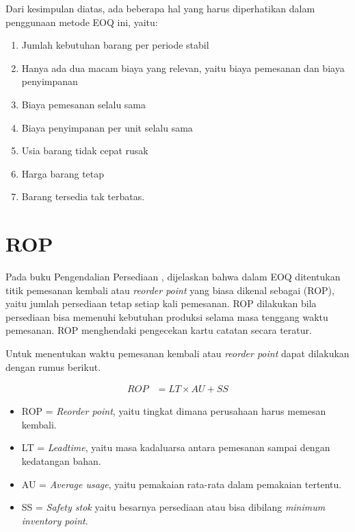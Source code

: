 Dari kesimpulan diatas, ada beberapa hal yang harus diperhatikan dalam penggunaan metode EOQ ini, yaitu:

\begin{enumerate}
	\item Jumlah kebutuhan barang per periode stabil
	\item Hanya ada dua macam biaya yang relevan, yaitu biaya pemesanan dan biaya penyimpanan
	\item Biaya pemesanan selalu sama
	\item Biaya penyimpanan per unit selalu sama
	\item Usia barang tidak cepat rusak
	\item Harga barang tetap
	\item Barang tersedia tak terbatas.
\end{enumerate}

\section{ROP}

Pada buku Pengendalian Persediaan \citep{pengendalianpersediaan}, dijelaskan bahwa dalam EOQ ditentukan titik pemesanan kembali atau \textit{reorder point} yang biasa dikenal sebagai (ROP), yaitu jumlah persediaan tetap setiap kali pemesanan. ROP dilakukan bila persediaan bisa memenuhi kebutuhan produksi selama masa tenggang waktu pemesanan. ROP menghendaki pengecekan kartu catatan secara teratur.

Untuk menentukan waktu pemesanan kembali atau \textit{reorder point} dapat dilakukan dengan rumus berikut.

\begin{equation}
    \begin{split}
		ROP
		&= LT \times AU + SS
    \end{split}
\end{equation}

\begin{itemize}
	\item ROP = \textit{Reorder point}, yaitu tingkat dimana perusahaan harus memesan kembali. 
	\item LT = \textit{Leadtime}, yaitu masa kadaluarsa antara pemesanan sampai dengan kedatangan bahan.
	\item AU = \textit{Average usage}, yaitu pemakaian rata-rata dalam pemakaian tertentu.
	\item SS = \textit{Safety stok} yaitu besarnya persediaan atau bisa dibilang \textit{minimum inventory point}.
\end{itemize}


